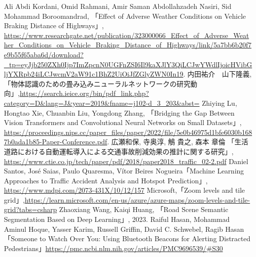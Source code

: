 \documentclass[uplatex,dvipdfmx]{jsarticle}
\begin{document}
\begin{thebibliography}{16}
Ali Abdi Kordani, Omid Rahmani, Amir Saman Abdollahzadeh Nasiri, Sid Mohammad Boroomandrad, 「Effect of Adverse Weather Conditions on Vehicle Braking
Distance of Highways」, \url{https://www.researchgate.net/publication/323000066_Effect_of_Adverse_Weather_Conditions_on_Vehicle_Braking_Distance_of_Highways/link/5a7bb6b20f7e9b55f65aba6d/download?_tp=eyJjb250ZXh0Ijp7ImZpcnN0UGFnZSI6Il9kaXJlY3QiLCJwYWdlIjoicHVibGljYXRpb24iLCJwcmV2aW91c1BhZ2UiOiJfZGlyZWN0In19}.
 内田祐介　山下隆義,「物体認識のための畳み込みニューラルネットワークの研究動向」,\url{https://search.ieice.org/bin/pdf_link.php?category=D&lang=J&year=2019&fname=j102-d_3_203&abst=}
 Zhiying Lu, Hongtao Xie, Chuanbin Liu, Yongdong Zhang, 「Bridging the Gap Between Vision Transformers and
Convolutional Neural Networks on Small Datasets」, \url{https://proceedings.nips.cc/paper_files/paper/2022/file/5e0b46975d1bfe6030b1687b0ada1b85-Paper-Conference.pdf}.
 広瀬和保, 寺奥淳, 鵤 貴之, 森本 章倫 「生活道路における自動運転導入による交通事故削減効果の推計に関する研究」, \url{https://www.ctie.co.jp/tech/paper/pdf/2018/paper2018_traffic_02-2.pdf}
 Daniel Santos, José Saias, Paulo Quaresma, Vítor Beires Nogueira「Machine Learning Approaches to Traffic Accident Analysis and Hotspot Prediction」, \url{https://www.mdpi.com/2073-431X/10/12/157}
Microsoft,「Zoom levels and tile grid」,\url{https://learn.microsoft.com/en-us/azure/azure-maps/zoom-levels-and-tile-grid?tabs=csharp}
Zhaoxiang Wang, Kaiqi Huang, 「Road Scene Semantic Segmentation Based on Deep Learning」, 2023.
Raiful Hasan, Mohammad Aminul Hoque, Yasser Karim, Russell Griffin, David C. Schwebel, Ragib Hasan「Someone to Watch Over You: Using Bluetooth Beacons for Alerting Distracted Pedestrians」\url{https://pmc.ncbi.nlm.nih.gov/articles/PMC9696539/#S30}
\end{thebibliography}
\end{document}
